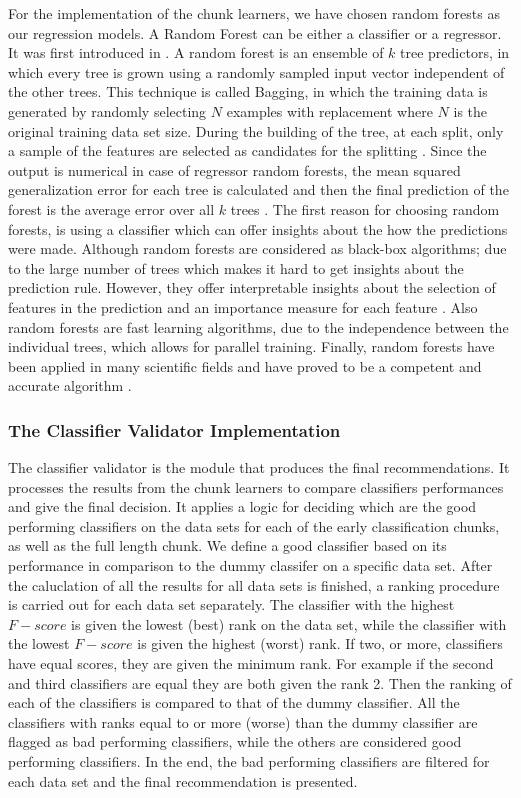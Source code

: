 For the implementation of the chunk learners, we have chosen random forests as our regression models.
A Random Forest can be either a classifier or a regressor. It was first introduced in \cite{breiman2001random}.
A random forest is an ensemble of $k$ tree predictors, in which every tree is grown using a randomly sampled input vector independent of the other trees.
This technique is called Bagging, in which the training data is generated by randomly selecting $N$ examples with replacement where $N$ is the original training data set size.
During the building of the tree, at each split, only a sample of the features are selected as candidates for the splitting \cite{couronne2018random}.
Since the output is numerical in case of regressor random forests, the mean squared generalization error for each tree is calculated and then the final prediction of the forest is the average
error over all $k$ trees \cite{singh2017modelling}.
The first reason for choosing random forests, is using a classifier which can offer insights about the how the predictions were made. 
Although random forests are considered as black-box algorithms; due to the large number of trees which makes it hard to get insights about the prediction rule.
However, they offer interpretable insights about the selection of features in the prediction and an importance measure for each feature \cite{couronne2018random}.
Also random forests are fast learning algorithms, due to the independence between the individual trees, which allows for parallel training.
Finally, random forests have been applied in many scientific fields and have proved to be a competent and accurate algorithm \cite{jog2017random, couronne2018random}.


\subsubsection*{The Classifier Validator Implementation}
\label{ClassifierValidatorImplementation}
The classifier validator is the module that produces the final recommendations. It processes the results from the chunk learners to compare classifiers performances and give the final decision.
It applies a logic for deciding which are the good performing classifiers on the data sets for each of the early classification chunks, as well as the full length chunk.
We define a good classifier based on its performance in comparison to the dummy classifer on a specific data set.
After the caluclation of all the results for all data sets is finished, a ranking procedure is carried out for each data set separately.
The classifier with the highest $F-score$ is given the lowest (best) rank on the data set, while the classifier with the lowest $F-score$ is given the highest (worst) rank.
If two, or more, classifiers have equal scores, they are given the minimum rank. For example if the second and third classifiers are equal they are both given the rank 2.
Then the ranking of each of the classifiers is compared to that of the dummy classifier.
All the classifiers with ranks equal to or more (worse) than the dummy classifier are flagged as bad performing classifiers, while the others are considered good performing classifiers.
In the end, the bad performing classifiers are filtered for each data set and the final recommendation is presented.

